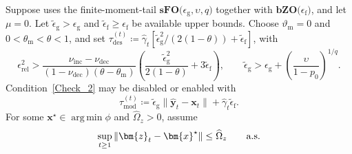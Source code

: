 \documentclass{article}
\begin{document}
\begin{assumption}
\label{ass:mu_zero_sfo_bzo}
Suppose  uses the finite-moment-tail \(\textbf{sFO(}\epsilon_{\mathrm g},\upsilon,q\textbf{)}\) together with \(\textbf{bZO(}\epsilon_{\mathrm f}\textbf{)}\), and let \(\mu=0\). Let
\(\widetilde\epsilon_{\mathrm{g}}>\epsilon_{\mathrm{g}}\) and
\(\widetilde\epsilon_{\mathrm{f}}\ge\epsilon_{\mathrm{f}}\) be available upper bounds.
Choose \(\vartheta_{\mathrm{m}}=0\) and
\(0<\theta_{\mathrm{m}}<\theta<1\), and set
\(\tau_{\mathrm{des}}^{(t)}\coloneqq \hat\gamma_t
[\widetilde\epsilon_{\mathrm{g}}^2/(2(1-\theta))+\widetilde\epsilon_{\mathrm{f}}]\), with
\begin{equation}\label{eq:tolerances_mu_zero_sfo}
\epsilon_{\mathrm{rel}}^2>
\frac{\nu_{\mathrm{inc}}-\nu_{\mathrm{dec}}}
{(1-\nu_{\mathrm{dec}})(\theta-\theta_{\mathrm{m}})}
\left(\frac{\widetilde\epsilon_{\mathrm{g}}^2}{2(1-\theta)}
+3\widetilde\epsilon_{\mathrm{f}}\right),
\qquad
\widetilde\epsilon_{\mathrm{g}}>\epsilon_{\mathrm{g}}+
\left(\frac{\upsilon}{1-p_0}\right)^{1/q}.
\end{equation}
Condition~\eqref{Check_2} may be disabled or enabled with
\begin{equation}\label{eq:model_tolerance_mu_zero_sfo}
\tau_{\mathrm{mod}}^{(t)}\coloneqq 
\widetilde\epsilon_{\mathrm{g}}\|\hat {\bm{y}}_t-\bm{x}_t\|
+\hat\gamma_t\widetilde\epsilon_{\mathrm{f}}.
\end{equation}
For some \(\bm{x}^\star\in\operatorname*{arg\,min}\phi\) and
\(\widehat\Omega_z>0\), assume
\begin{equation}\label{eq:bounded_auxiliary_mu_zero_sfo}
\sup_{t\ge1}\|\bm{z}_t-\bm{x}^\star\|\le\widehat\Omega_z
\qquad\textnormal{a.s.}
\end{equation}
\end{assumption}
\end{document}
